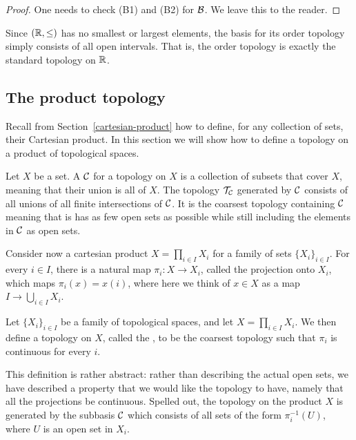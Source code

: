 \begin{proof}
  One needs to check (B1) and (B2) for $\mathcal{B}$. We leave this to the reader.
\end{proof}
\begin{example}
  Since $(\mathbb{R},\leq)$ has no smallest or largest elements, the basis for its order topology simply consists of all open intervals. That is, the order topology is exactly the standard topology on $\mathbb{R}$.
\end{example}

\subsection{The product topology}
Recall from Section~\ref{cartesian-product} how to define, for any collection of sets, their Cartesian product. In this section we will show how to define a topology on a product of topological spaces.

\begin{defn}
  Let $X$ be a set. A  $\mathcal{C}$ for a topology on $X$ is a collection of subsets that cover $X$, meaning that their union is all of $X$. The topology $\mathcal{T}_{\mathcal{C}}$ generated by $\mathcal{C}$ consists of all unions of all finite intersections of $\mathcal{C}$. It is the coarsest topology containing $\mathcal{C}$ meaning that is has as few open sets as possible while still including the elements in $\mathcal{C}$ as open sets.
\end{defn}
Consider now a cartesian product $X = \prod_{i \in I} X_i$ for a family of sets $\{ X_i \}_{i \in I}$. For every $i \in I$, there is a natural map $\pi_i : X \to X_i$, called the projection onto $X_i$, which maps $\pi_i(x) = x(i)$, where here we think of $x \in X$ as a map $I \to \bigcup_{i \in I} X_i$.

\begin{defn}
  Let $\{ X_i \}_{i \in I}$ be a family of topological spaces, and let $X = \prod_{i \in I} X_i$. We then define a topology on $X$, called the , to be the coarsest topology such that $\pi_i$ is continuous for every $i$.
\end{defn}
This definition is rather abstract: rather than describing the actual open sets, we have described a property that we would like the topology to have, namely that all the projections be continuous. Spelled out, the topology on the product $X$ is generated by the subbasis $\mathcal{C}$ which consists of all sets of the form $\pi_i^{-1}(U)$, where $U$ is an open set in $X_i$.

